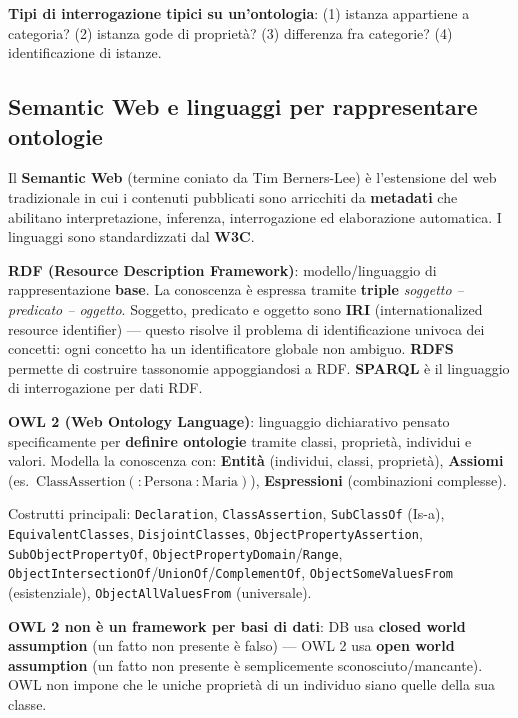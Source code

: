 \documentclass[11pt,a4paper]{report}
\begin{document}
\textbf{Tipi di interrogazione tipici su un'ontologia}: (1) istanza appartiene a categoria? (2) istanza gode di proprietà? (3) differenza fra categorie? (4) identificazione di istanze.

\subsection{Semantic Web e linguaggi per rappresentare ontologie}

Il \textbf{Semantic Web} (termine coniato da Tim Berners-Lee) è l'estensione del web tradizionale in cui i contenuti pubblicati sono arricchiti da \textbf{metadati} che abilitano interpretazione, inferenza, interrogazione ed elaborazione automatica. I linguaggi sono standardizzati dal \textbf{W3C}.

\textbf{RDF (Resource Description Framework)}: modello/linguaggio di rappresentazione \textbf{base}. La conoscenza è espressa tramite \textbf{triple} \emph{soggetto -- predicato -- oggetto}. Soggetto, predicato e oggetto sono \textbf{IRI} (internationalized resource identifier) --- questo risolve il problema di identificazione univoca dei concetti: ogni concetto ha un identificatore globale non ambiguo. \textbf{RDFS} permette di costruire tassonomie appoggiandosi a RDF. \textbf{SPARQL} è il linguaggio di interrogazione per dati RDF.

\begingroup\sloppy
\textbf{OWL 2 (Web Ontology Language)}: linguaggio dichiarativo pensato specificamente per \textbf{definire ontologie} tramite classi, proprietà, individui e valori. Modella la conoscenza con: \textbf{Entità} (individui, classi, proprietà), \textbf{Assiomi} (es.\ $\text{ClassAssertion}(:\text{Persona}\ :\text{Maria})$), \textbf{Espressioni} (combinazioni complesse).
\endgroup

\begingroup\sloppy
Costrutti principali: \texttt{Declaration}, \texttt{ClassAssertion}, \texttt{SubClassOf} (Is-a), \texttt{EquivalentClasses}, \texttt{DisjointClasses}, \texttt{ObjectPropertyAssertion}, \texttt{SubObjectPropertyOf}, \texttt{ObjectPropertyDomain}/\texttt{Range}, \texttt{ObjectIntersectionOf}/\texttt{UnionOf}/\texttt{ComplementOf}, \texttt{ObjectSomeValuesFrom} (esistenziale), \texttt{ObjectAllValuesFrom} (universale).
\endgroup

\textbf{OWL 2 non è un framework per basi di dati}: DB usa \textbf{closed world assumption} (un fatto non presente è falso) --- OWL 2 usa \textbf{open world assumption} (un fatto non presente è semplicemente sconosciuto/mancante). OWL non impone che le uniche proprietà di un individuo siano quelle della sua classe.
\end{document}
